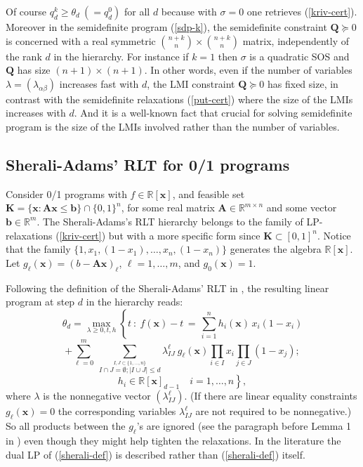 \documentclass[11pt]{article}
\numberwithin{equation}{section}
\def\x{\mathbf{x}}
\def\R{\mathbb{R}}
\def\K{\mathbf{K}}
\def\Q{\mathbf{Q}}
\def\A{\mathbf{A}}
\def\b{\mathcal{B}}
\def\b{\mathbf{b}}
\begin{document}
Of course $q^k_d\geq\theta_d\:(=q^0_d)$ for all $d$ because with $\sigma=0$ one retrieves (\ref{kriv-cert}).
Moreover in the semidefinite program (\ref{sdp-k}),
the semidefinite constraint $\Q\succeq0$ is concerned with a 
real symmetric ${n+k\choose n}\times {n+k\choose n}$ matrix, independently of the rank $d$ in the hierarchy. For instance
if $k=1$ then $\sigma$ is a quadratic SOS and $\Q$ has size $(n+1)\times (n+1)$.
In other words, even if the number of variables $\lambda=(\lambda_{\alpha\beta})$ increases fast
 with $d$, the LMI constraint $\Q\succeq0$ has fixed size, in contrast with the semidefinite relaxations
 (\ref{put-cert}) where the size of the LMIs increases with $d$. And it is a well-known fact that 
 crucial for solving semidefinite program is the size of the
 LMIs involved rather than the number of variables.
 
 
\subsection{Sherali-Adams' RLT for 0/1 programs}
\label{sherali}
Consider 0/1 programs with $f\in\R[\x]$, and feasible set $\K=\{\x:\A\x\leq\b\}\cap\{0,1\}^n$, for some
real matrix $\A\in\R^{m\times n}$ and some vector $\b\in\R^m$. The Sherali-Adams's RLT hierarchy \cite{SheraliAdams90} belongs to the family
of LP-relaxations (\ref{kriv-cert}) but with a more specific form since $\K\subset [0,1]^n$. Notice
that the family $\{1,x_1,(1-x_1),\ldots,x_n,(1-x_n)\}$ generates the algebra $\R[\x]$. Let
$g_\ell(\x)=(b-\A\x)_\ell$, $\ell=1,\ldots,m$, and $g_0(\x)=1$. 

Following the definition of the Sherali-Adams' RLT in \cite{SheraliAdams90},
the resulting linear program at step $d$ in the hierarchy reads:
\[\theta_d=\displaystyle\max_{\lambda\geq0,t,h}\left \{ t\::\:f(\x)-t\,=\,\sum_{i=1}^nh_i(\x)\,x_i(1-x_i)\right.\]
\[+\sum_{\ell=0}^m\:\displaystyle\sum_{\stackrel{I,J\subset\{1,\ldots,n\}}{
I\cap J=\emptyset; \vert I\cup J\vert \leq d}}
\lambda^\ell_{IJ}\:g_\ell(\x)\prod_{i\in I}x_i\prod_{j\in J}(1-x_j);\]
\begin{equation}
\label{sherali-def}
\left.h_i\in\R[\x]_{d-1} \quad i=1,\ldots,n\right\},\end{equation}
where $\lambda$ is the nonnegative vector $(\lambda^\ell_{IJ})$. 
(If there are linear equality constraints $g_\ell(\x)=0$ the corresponding variables $\lambda^\ell_{IJ}$ are
not required to be nonnegative.)
So all products between the $g_\ell$'s are ignored
(see the paragraph before Lemma 1 in \cite[p. 414]{SheraliAdams90}) even though they might help tighten the relaxations.
In the literature the dual LP of (\ref{sherali-def}) is described rather than (\ref{sherali-def}) itself.
\end{document}
